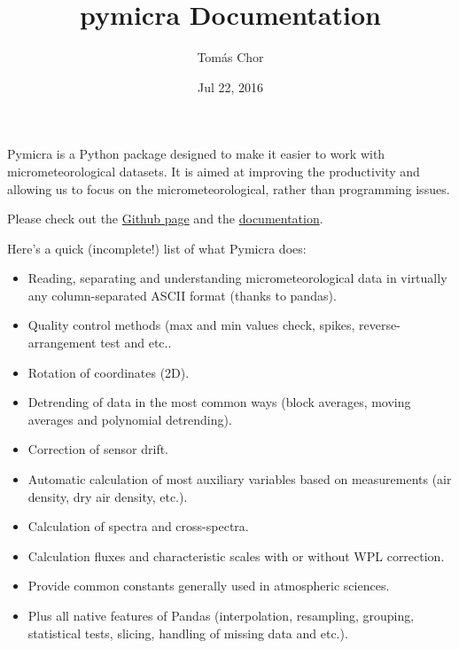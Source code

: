 \documentclass[a4paper,10pt,english]{sphinxmanual}
\title{pymicra Documentation}
\date{Jul 22, 2016}
\author{Tomás Chor}
\begin{document}
\maketitle
\tableofcontents
{}\label{index::doc}


Pymicra is a Python package designed to make it easier to work with
micrometeorological datasets. It is aimed at improving the productivity and
allowing us to focus on the micrometeorological, rather than programming
issues.

Please check out the \href{https://github.com/tomchor/pymicra}{Github page} and the
\href{http://tomchor.github.io/pymicra/}{documentation}.

Here's a quick (incomplete!) list of what Pymicra does:
\begin{itemize}
\item {} 
Reading, separating and understanding micrometeorological data in
virtually any column-separated ASCII format (thanks to pandas).

\item {} 
Quality control methods (max and min values check, spikes,
reverse-arrangement test and etc..

\item {} 
Rotation of coordinates (2D).

\item {} 
Detrending of data in the most common ways (block averages, moving
averages and polynomial detrending).

\item {} 
Correction of sensor drift.

\item {} 
Automatic calculation of most auxiliary variables based on
measurements (air density, dry air density, etc.).

\item {} 
Calculation of spectra and cross-spectra.

\item {} 
Calculation fluxes and characteristic scales with or without WPL correction.

\item {} 
Provide common constants generally used in atmospheric sciences.

\item {} 
Plus all native features of Pandas (interpolation, resampling,
grouping, statistical tests, slicing, handling of missing data and
etc.).

\end{itemize}
\end{document}
